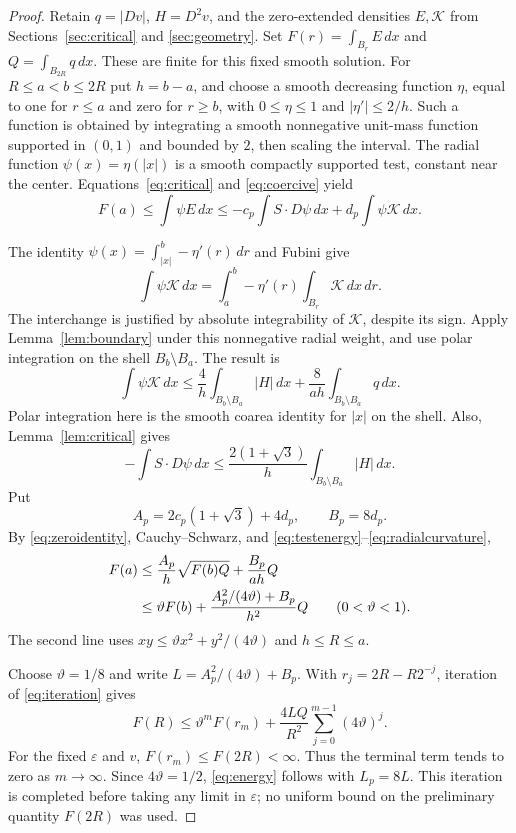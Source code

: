 \documentclass[11pt]{article}
\theoremstyle{remark}
\newcommand{\dd}{\,dx}
\newcommand{\eps}{\varepsilon}
\begin{document}
\begin{proof}
Retain $q=|Dv|$, $H=D^2v$, and the zero-extended densities
$E,\mathcal K$ from Sections~\ref{sec:critical} and
\ref{sec:geometry}. Set
$F(r)=\int_{B_r}E\dd$ and $Q=\int_{B_{2R}}q\dd$.
These are finite for this fixed smooth solution.
For $R\leq a<b\leq2R$ put $h=b-a$, and choose a smooth
decreasing function $\eta$, equal to one for $r\leq a$ and
zero for $r\geq b$, with $0\leq\eta\leq1$ and
$|\eta'|\leq2/h$. Such a function is obtained by integrating
a smooth nonnegative unit-mass function supported in $(0,1)$
and bounded by $2$, then scaling the interval. The radial
function $\psi(x)=\eta(|x|)$ is a smooth compactly supported
test, constant near the center.
Equations~\eqref{eq:critical} and \eqref{eq:coercive} yield
\begin{equation}\label{eq:testenergy}
 F(a)\leq\int\psi E\dd
 \leq-c_p\int S\cdot D\psi\dd+d_p\int\psi\mathcal K\dd.
\end{equation}

The identity $\psi(x)=\int_{|x|}^b-\eta'(r)\,dr$ and Fubini give
\[
 \int\psi\mathcal K\dd
 =\int_a^b-\eta'(r)\int_{B_r}\mathcal K\dd\,dr.
\]
The interchange is justified by absolute integrability of
$\mathcal K$, despite its sign. Apply Lemma~\ref{lem:boundary}
under this nonnegative radial weight, and use polar integration
on the shell $B_b\setminus B_a$. The result is
\begin{equation}\label{eq:radialcurvature}
 \int\psi\mathcal K\dd
 \leq\frac4h\int_{B_b\setminus B_a}|H|\dd
       +\frac8{ah}\int_{B_b\setminus B_a}q\dd.
\end{equation}
Polar integration here is the smooth coarea identity for $|x|$
on the shell.
Also, Lemma~\ref{lem:critical} gives
\[
 -\int S\cdot D\psi\dd
 \leq\frac{2(1+\sqrt3)}h\int_{B_b\setminus B_a}|H|\dd.
\]
Put
\[
 A_p=2c_p(1+\sqrt3)+4d_p,\qquad B_p=8d_p.
\]
By \eqref{eq:zeroidentity}, Cauchy--Schwarz, and
\eqref{eq:testenergy}--\eqref{eq:radialcurvature},
\begin{align}
 F(a)&\leq\frac{A_p}{h}\sqrt{F(b)Q}+\frac{B_p}{ah}Q\notag\\
 &\leq\vartheta F(b)
   +\frac{A_p^2/(4\vartheta)+B_p}{h^2}Q
   \qquad(0<\vartheta<1). \label{eq:iteration}
\end{align}
The second line uses $xy\leq\vartheta x^2+y^2/(4\vartheta)$
and $h\leq R\leq a$.

Choose $\vartheta=1/8$ and write
$L=A_p^2/(4\vartheta)+B_p$.
With $r_j=2R-R2^{-j}$, iteration of \eqref{eq:iteration} gives
\[
 F(R)\leq\vartheta^mF(r_m)
    +\frac{4LQ}{R^2}\sum_{j=0}^{m-1}(4\vartheta)^j.
\]
For the fixed $\eps$ and $v$, $F(r_m)\leq F(2R)<\infty$.
Thus the terminal term tends to zero as $m\to\infty$.
Since $4\vartheta=1/2$, \eqref{eq:energy} follows with $L_p=8L$.
This iteration is completed before taking any limit in $\eps$;
no uniform bound on the preliminary quantity $F(2R)$ was used.
\end{proof}
\end{document}
